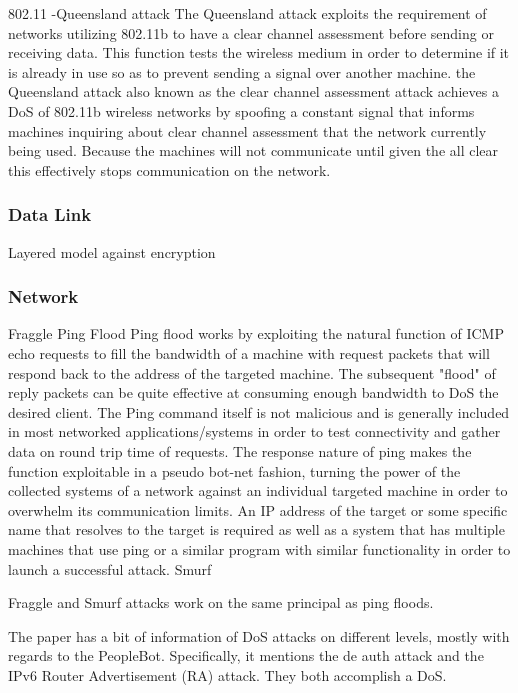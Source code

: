 802.11%
-Queensland attack
The Queensland attack exploits the requirement of networks utilizing 802.11b to have a clear channel assessment before sending or receiving data.  This function tests the wireless medium in order to determine if it is already in use so as to prevent sending a signal over another machine.  the Queensland attack also known as the clear channel assessment attack achieves a DoS of 802.11b wireless networks by spoofing a constant signal that informs machines inquiring about clear channel assessment that the network currently being used.  Because the machines will not communicate until given the all clear this effectively stops communication on the network. 
\subsubsection{Data Link}

Layered model against encryption
\subsubsection{Network}
Fraggle
Ping Flood
Ping flood works by exploiting the natural function of ICMP echo requests to fill the bandwidth of a machine with request packets that will respond back to the address of the targeted machine. The subsequent "flood" of reply packets can be quite effective at consuming enough bandwidth to DoS the desired client.  The Ping command itself is not malicious and is generally included in most networked applications/systems in order to test connectivity and gather data on round trip time of requests.  The response nature of ping makes the function exploitable in a pseudo bot-net fashion, turning the power of the collected systems of a network against an individual targeted machine in order to overwhelm its communication limits.  An IP address of the target or some specific name that resolves to the target is required as well as a system that has multiple machines that use ping or a similar program with similar functionality in order to launch a successful attack.  
Smurf

Fraggle and Smurf attacks work on the same principal as ping floods.  

The paper \cite{Yousef2017PeopleBot} has a bit of information of DoS attacks on different levels, mostly with regards to the PeopleBot. Specifically, it mentions the de auth attack and the IPv6 Router Advertisement (RA) attack. They both accomplish a DoS.

